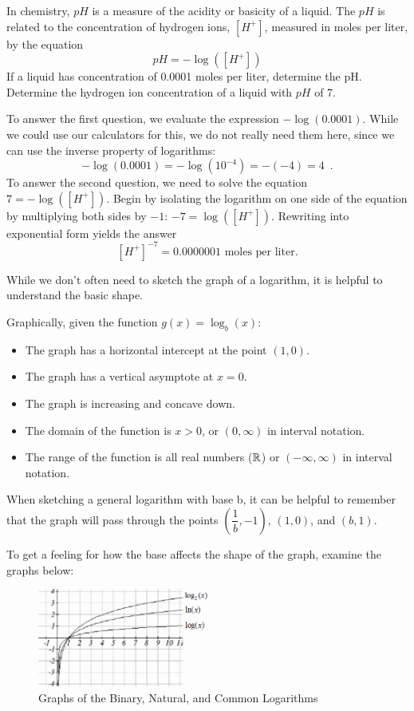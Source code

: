 \begin{example}
In chemistry, $pH$ is a measure of the acidity or basicity of a liquid. The $pH$ is related to the concentration of hydrogen ions, $[H^+]$, measured in moles per liter, by the equation
$$pH=-\log([H^+])$$
If a liquid has concentration of 0.0001 moles per liter, determine the pH. Determine the hydrogen ion concentration of a liquid with $pH$ of 7.

\begin{solution}  To answer the first question, we evaluate the expression $-\log(0.0001)$. While we could use our calculators for this, we do not really need them here, since we can use the inverse property of logarithms:
$$-\log(0.0001)=-\log(10^{-4})=-(-4)=4 \enspace .$$
To answer the second question, we need to solve the equation $7=-\log([H^+])$. Begin by isolating the logarithm on one side of the equation by multiplying both sides by $-1$: $-7=\log([H^+])$. Rewriting into exponential form yields the answer
$$[H^+]^{-7}=0.0000001 \mbox{ moles per liter.}$$
\end{solution}\end{example}

While we don't often need to sketch the graph of a logarithm, it is helpful to understand the basic shape.

\begin{theorem}
  Graphically, given the function $g(x)=\log_b(x)$:
  \begin{itemize}
    \item The graph has a horizontal intercept at the point $(1, 0)$.
    \item The graph has a vertical asymptote at $x=0$.
    \item The graph is increasing and concave down.
    \item The domain of the function is $x>0$, or $(0,\infty)$ in interval notation.
    \item The range of the function is all real numbers ($\mathbb{R}$) or $(-\infty,\infty)$ in interval notation.
  \end{itemize}
\end{theorem}
When sketching a general logarithm with base b, it can be helpful to remember that the graph will pass through the points $\left(\dfrac{1}{b}, -1\right)$, $(1,0)$, and $(b,1)$.

To get a feeling for how the base affects the shape of the graph, examine the graphs below:

\begin{figure}[ht!]
\centering
  \includegraphics[width=0.5\textwidth]{img/chap1/sec1-8/image080.png}
\caption{Graphs of the Binary, Natural, and Common Logarithms}
\end{figure}

